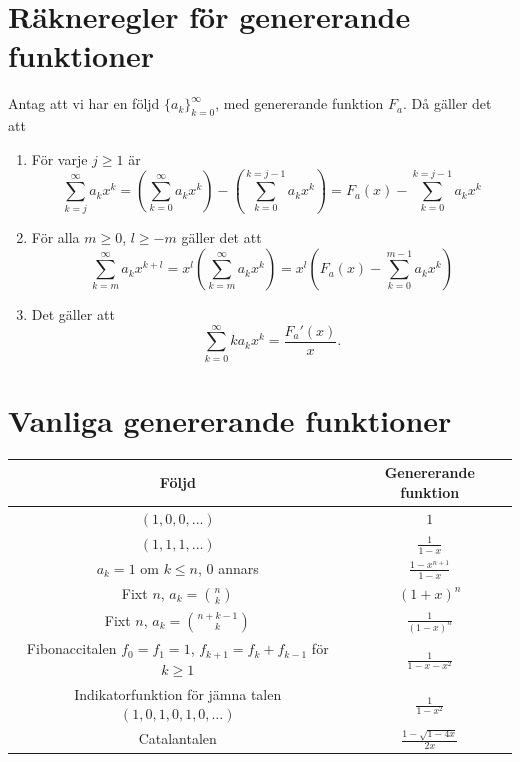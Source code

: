 \documentclass[nobib]{tufte-handout}
\begin{document}
\section{Räkneregler för genererande funktioner}

\begin{lemma}
  Antag att vi har en följd $\{a_k\}_{k=0}^\infty$, med genererande funktion $F_a$. Då gäller det att
    \begin{enumerate}
        \item För varje $j \geq 1$ är
        $$\sum_{k = j}^{\infty} a_k x^k = \left(\sum_{k=0}^{\infty}a_k x^k\right) - \left(\sum_{k=0}^{k=j-1} a_kx^k\right) = F_a(x) - \sum_{k=0}^{k=j-1} a_kx^k$$
        \item För alla $m \geq 0$, $l \geq -m$ gäller det att
        $$\sum_{k=m}^{\infty} a_k x^{k + l} = x^l\left(\sum_{k=m}^{\infty} a_k x^{k}\right) = x^l\left(F_a(x) - \sum_{k=0}^{m-1} a_k x^k\right)$$
        \item Det gäller att
        $$\sum_{k=0}^{\infty} k a_k x^k = \frac{F_a'(x)}{x}.$$
    \end{enumerate}
\end{lemma}

\section{Vanliga genererande funktioner}

\begin{tabularx}{\linewidth}{cc}
  Följd & Genererande funktion\\
  \midrule
  $(1, 0, 0, \ldots)$ & $1$\\
  $(1,1,1,\ldots)$ & $\frac{1}{1-x}$\\
  $a_k = 1$ om $k \leq n$, $0$ annars & $\frac{1 - x^{n+1}}{1 - x}$\\
  Fixt $n$, $a_k = \binom{n}{k}$ & $(1+x)^n$\\
  Fixt $n$, $a_k = \binom{n+k-1}{k}$ & $\frac{1}{(1-x)^n}$\\
  \specialcell{Fibonaccitalen\\$f_0 = f_1 = 1$, $f_{k+1} = f_k + f_{k-1}$ för $k \geq 1$} & $\frac{1}{1 - x - x^2}$\\
  \specialcell{Indikatorfunktion för jämna talen\\$(1,0,1,0,1,0,\ldots)$} & $\frac{1}{1-x^2}$\\
  Catalantalen & $\frac{1 - \sqrt{1 - 4x}}{2x}$
\end{tabularx}
\end{document}
